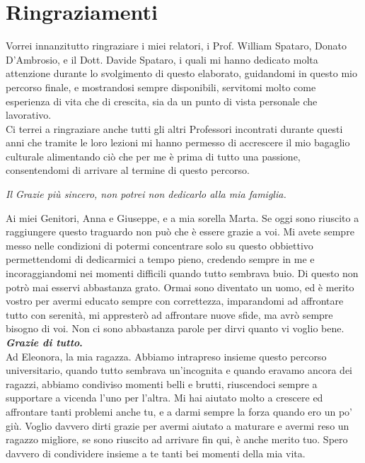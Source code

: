 \documentclass[tesi]{subfiles}
\begin{document}
\section*{Ringraziamenti}\label{sc:Ringraziamenti}
Vorrei innanzitutto ringraziare i miei relatori, i Prof. William Spataro, Donato D’Ambrosio, e il Dott. Davide Spataro, i quali mi hanno dedicato molta attenzione durante lo svolgimento di questo elaborato, guidandomi in questo mio percorso finale, e mostrandosi sempre disponibili, servitomi molto come esperienza di vita che di crescita, sia da un punto di vista personale che lavorativo.\\


Ci terrei a ringraziare anche tutti gli altri Professori incontrati durante questi anni che tramite le loro lezioni mi hanno permesso di accrescere il mio bagaglio culturale alimentando ciò che per me è prima di tutto una passione, consentendomi di arrivare al termine di questo percorso.\\

\begin{center}
\textit{Il Grazie più sincero, non potrei non dedicarlo alla mia famiglia.}\\
\end{center}

Ai miei Genitori, Anna e Giuseppe, e a mia sorella Marta. Se oggi sono riuscito a raggiungere questo traguardo non può che è essere grazie a voi. Mi avete sempre messo nelle condizioni di potermi concentrare solo su questo obbiettivo permettendomi di dedicarmici a tempo pieno, credendo sempre in me e incoraggiandomi nei momenti difficili quando tutto sembrava buio. Di questo non potrò mai esservi abbastanza grato. Ormai sono diventato un uomo, ed è merito vostro per avermi educato sempre con correttezza, imparandomi ad affrontare tutto con serenità, mi appresterò ad affrontare nuove sfide, ma avrò sempre bisogno di voi.
Non ci sono abbastanza parole per dirvi quanto vi voglio bene. \textbf{\textit{Grazie di tutto}.}\\


Ad Eleonora, la mia ragazza. Abbiamo intrapreso insieme questo percorso universitario, quando tutto sembrava un’incognita e quando eravamo ancora dei ragazzi, abbiamo condiviso momenti belli e brutti, riuscendoci sempre a supportare a vicenda l’uno per l’altra. Mi hai aiutato molto a crescere ed affrontare tanti problemi anche tu, e a darmi sempre la forza quando ero un po’ giù. Voglio davvero dirti grazie per avermi aiutato a maturare e avermi reso un ragazzo migliore, se sono riuscito ad arrivare fin qui, è anche merito tuo. Spero davvero di condividere insieme a te tanti bei momenti della mia vita.\\
\end{document}
